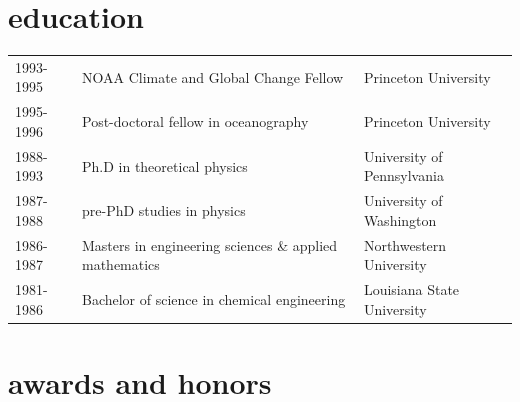 \documentclass{article}
\begin{document}
\section*{\sc \color{Maroon} education}
\vspace{-.25cm}
\begin{tabular}{lll}
1993-1995  &  NOAA Climate and Global Change Fellow  & Princeton University \\
1995-1996  &  Post-doctoral fellow in oceanography  & Princeton University \\
1988-1993  &  Ph.D in theoretical physics  & University of Pennsylvania \\
1987-1988  &  pre-PhD studies in physics & University of Washington\\
1986-1987  &  Masters in engineering sciences \& applied mathematics   & Northwestern University\\
1981-1986  &  Bachelor of science in chemical engineering  & Louisiana State University 
\end{tabular}


\section*{\sc  \color{Maroon}   awards and honors}
\vspace{-.25cm}
\end{document}
